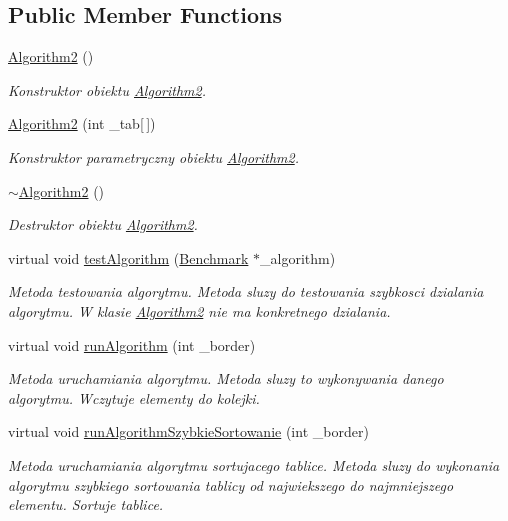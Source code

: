 \subsection*{Public Member Functions}
\begin{DoxyCompactItemize}
\item 
\hyperlink{class_algorithm2_ad77a51433815456eca8139444e78b49b}{Algorithm2} ()
\begin{DoxyCompactList}\small\item\em Konstruktor obiektu \hyperlink{class_algorithm2}{Algorithm2}. \end{DoxyCompactList}\item 
\hyperlink{class_algorithm2_ac5cc064a2727d2c1a2b32d335cd73f8d}{Algorithm2} (int \-\_\-tab\mbox{[}$\,$\mbox{]})
\begin{DoxyCompactList}\small\item\em Konstruktor parametryczny obiektu \hyperlink{class_algorithm2}{Algorithm2}. \end{DoxyCompactList}\item 
\hyperlink{class_algorithm2_ab2c630f56f5d2e90f62a13fdaf0cd954}{$\sim$\-Algorithm2} ()
\begin{DoxyCompactList}\small\item\em Destruktor obiektu \hyperlink{class_algorithm2}{Algorithm2}. \end{DoxyCompactList}\item 
virtual void \hyperlink{class_algorithm2_a6eb066d5e51f2187e717454751bc2934}{test\-Algorithm} (\hyperlink{class_benchmark}{Benchmark} $\ast$\-\_\-algorithm)
\begin{DoxyCompactList}\small\item\em Metoda testowania algorytmu. Metoda sluzy do testowania szybkosci dzialania algorytmu. W klasie \hyperlink{class_algorithm2}{Algorithm2} nie ma konkretnego dzialania. \end{DoxyCompactList}\item 
virtual void \hyperlink{class_algorithm2_a409e58d5fb0b6d2407cc986cf163703b}{run\-Algorithm} (int \-\_\-border)
\begin{DoxyCompactList}\small\item\em Metoda uruchamiania algorytmu. Metoda sluzy to wykonywania danego algorytmu. Wczytuje elementy do kolejki. \end{DoxyCompactList}\item 
virtual void \hyperlink{class_algorithm2_ac783dcbd44e804260d17ce0846530afc}{run\-Algorithm\-Szybkie\-Sortowanie} (int \-\_\-border)
\begin{DoxyCompactList}\small\item\em Metoda uruchamiania algorytmu sortujacego tablice. Metoda sluzy do wykonania algorytmu szybkiego sortowania tablicy od najwiekszego do najmniejszego elementu. Sortuje tablice. \end{DoxyCompactList}\end{DoxyCompactItemize}
